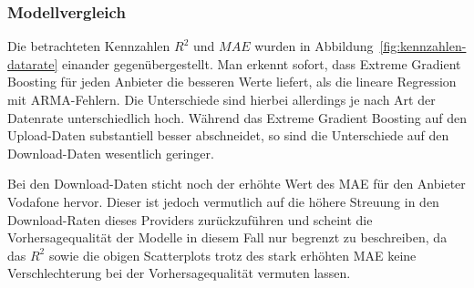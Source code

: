 \subsubsection{Modellvergleich}

Die betrachteten Kennzahlen $R^2$ und $MAE$ wurden in Abbildung~\ref{fig:kennzahlen-datarate} einander gegen\"ubergestellt.
Man erkennt sofort, dass Extreme Gradient Boosting f\"ur jeden Anbieter die besseren Werte liefert, als die lineare Regression mit
ARMA-Fehlern.
Die Unterschiede sind hierbei allerdings je nach Art der Datenrate unterschiedlich hoch.
W\"ahrend das Extreme Gradient Boosting auf den Upload-Daten substantiell besser abschneidet,
so sind die Unterschiede auf den Download-Daten wesentlich geringer.

Bei den Download-Daten sticht noch der erh\"ohte Wert des MAE f\"ur den Anbieter Vodafone hervor.
Dieser ist jedoch vermutlich auf die h\"ohere Streuung in den Download-Raten dieses Providers zur\"uckzuf\"uhren und scheint die
Vorhersagequalit\"at der Modelle in diesem Fall nur begrenzt zu beschreiben, da das $R^2$ sowie die obigen Scatterplots
trotz des stark erh\"ohten MAE keine Verschlechterung bei der Vorhersagequalit\"at vermuten lassen.

